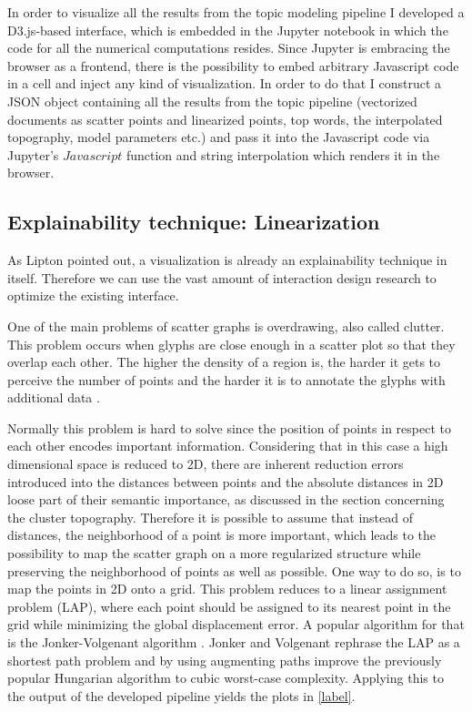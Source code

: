 In order to visualize all the results from the topic modeling pipeline I developed a D3.js-based interface, which is embedded in the Jupyter notebook in which the code for all the numerical computations resides. Since Jupyter is embracing the browser as a frontend, there is the possibility to embed arbitrary Javascript code in a cell and inject any kind of visualization. In order to do that I construct a JSON object containing all the results from the topic pipeline (vectorized documents as scatter points and linearized points, top words, the interpolated topography, model parameters etc.) and pass it into the Javascript code via Jupyter's $Javascript$ function and string interpolation which renders it in the browser.

\subsection{Explainability technique: Linearization}

As Lipton \cite{liptonMythosModelInterpretability2016a} pointed out, a visualization is already an explainability technique in itself. Therefore we can use the vast amount of interaction design research to optimize the existing interface. 

One of the main problems of scatter graphs is overdrawing, also called clutter. This problem occurs when glyphs are close enough in a scatter plot so that they overlap each other. The higher the density of a region is, the harder it gets to perceive the number of points and the harder it is to annotate the glyphs with additional data \cite{mayorgaSplatterplotsOvercomingOverdraw2013}. 

Normally this problem is hard to solve since the position of points in respect to each other encodes important information. Considering that in this case a high dimensional space is reduced to 2D, there are inherent reduction errors introduced into the distances between points and the absolute distances in 2D loose part of their semantic importance, as discussed in the section concerning the cluster topography. Therefore it is possible to assume that instead of distances, the neighborhood of a point is more important, which leads to the possibility to map the scatter graph on a more regularized structure while preserving the neighborhood of points as well as possible. One way to do so, is to map the points in 2D onto a grid. This problem reduces to a linear assignment problem (LAP), where each point should be assigned to its nearest point in the grid while minimizing the global displacement error. A popular algorithm for that is the Jonker-Volgenant algorithm \cite{jonkerShortestAugmentingPath1987}. Jonker and Volgenant rephrase the LAP as a shortest path problem and by using augmenting paths improve the previously popular Hungarian algorithm to cubic worst-case complexity. 
Applying this to the output of the developed pipeline yields the plots in \autoref{label}.
